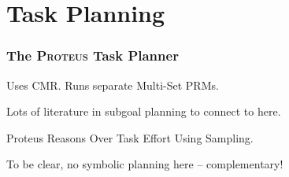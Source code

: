\chapter{Task Planning}
\label{chap:task-planning}

\subsection{The \textsc{Proteus} Task Planner}

Uses CMR.
Runs separate Multi-Set PRMs.

Lots of literature in subgoal planning to connect to here.

Proteus Reasons Over Task Effort Using Sampling.

To be clear, no symbolic planning here --
complementary!
